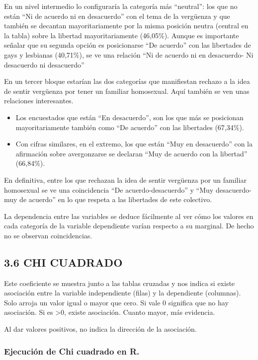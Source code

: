 \documentclass[
  12 pt,
  a4paper,
]{article}
\begin{document}
En un nivel intermedio lo configuraría la categoría más ``neutral'': los
que no están ``Ni de acuerdo ni en desacuerdo'' con el tema de la
vergüenza y que también se decantan mayoritariamente por la misma
posición neutra (central en la tabla) sobre la libertad mayoritariamente
(46,05\%). Aunque es importante señalar que su segunda opción es
posicionarse ``De acuerdo'' con las libertades de gays y lesbianas
(40,71\%), se ve una relación ``Ni de acuerdo ni en desacuerdo- Ni
desacuerdo ni desacuerdo''

En un tercer bloque estarían las dos categorías que manifiestan rechazo
a la idea de sentir vergüenza por tener un familiar homosexual. Aquí
también se ven unas relaciones interesantes.

\begin{itemize}
\item
  Los encuestados que están ``En desacuerdo'', son los que más se
  posicionan mayoritariamente también como ``De acuerdo'' con las
  libertades (67,34\%).
\item
  Con cifras similares, en el extremo, los que están ``Muy en
  desacuerdo'' con la afirmación sobre avergonzarse se declaran ``Muy de
  acuerdo con la libertad'' (66,84\%).
\end{itemize}

En definitiva, entre los que rechazan la idea de sentir vergüenza por un
familiar homosexual se ve una coincidencia ``De acuerdo-desacuerdo'' y
``Muy desacuerdo-muy de acuerdo'' en lo que respeta a las libertades de
este colectivo.

La dependencia entre las variables se deduce fácilmente al ver cómo los
valores en cada categoría de la variable dependiente varían respecto a
su marginal. De hecho no se observan coincidencias.

\subsection{3.6 CHI CUADRADO}\label{chi-cuadrado}

Este coeficiente se muestra junto a las tablas cruzadas y nos indica si
existe asociación entre la variable independiente (filas) y la
dependiente (columnas). Solo arroja un valor igual o mayor que cero. Si
vale 0 significa que no hay asociación. Si es \textgreater0, existe
asociación. Cuanto mayor, más evidencia.

Al dar valores positivos, no indica la dirección de la asociación.

\subsubsection{Ejecución de Chi cuadrado en
R.}\label{ejecuciuxf3n-de-chi-cuadrado-en-r.}
\end{document}
